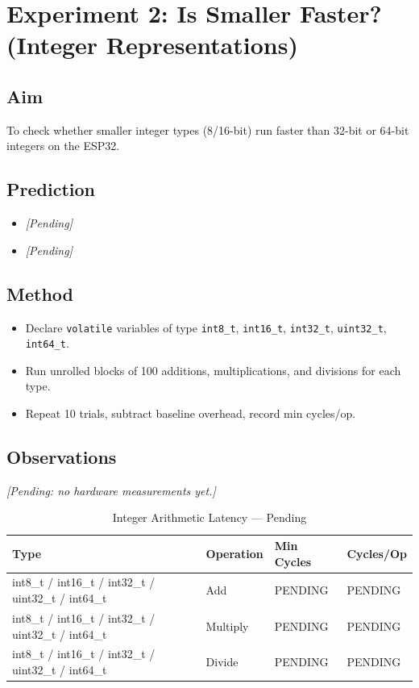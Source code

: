 \section{Experiment 2: Is Smaller Faster? (Integer Representations)}

\subsection{Aim}
To check whether smaller integer types (8/16-bit) run faster than 32-bit or 64-bit integers on the ESP32.

\subsection{Prediction}
\begin{itemize}[noitemsep]
    \item \textit{[Pending]}
    \item \textit{[Pending]}
\end{itemize}

\subsection{Method}
\begin{itemize}[noitemsep]
    \item Declare \texttt{volatile} variables of type \texttt{int8\_t}, \texttt{int16\_t}, \texttt{int32\_t}, \texttt{uint32\_t}, \texttt{int64\_t}.
    \item Run unrolled blocks of 100 additions, multiplications, and divisions for each type.
    \item Repeat 10 trials, subtract baseline overhead, record min cycles/op.
\end{itemize}

\subsection{Observations}
\textit{[Pending: no hardware measurements yet.]}

\begin{table}[htbp]
\centering
\caption{Integer Arithmetic Latency --- Pending}
\label{tab:exp2_obs}
\small
\begin{tabularx}{\textwidth}{l l X X}
\toprule
\textbf{Type} & \textbf{Operation} & \textbf{Min Cycles} & \textbf{Cycles/Op} \\
\midrule
int8\_t / int16\_t / int32\_t / uint32\_t / int64\_t & Add & PENDING & PENDING \\
int8\_t / int16\_t / int32\_t / uint32\_t / int64\_t & Multiply & PENDING & PENDING \\
int8\_t / int16\_t / int32\_t / uint32\_t / int64\_t & Divide & PENDING & PENDING \\
\bottomrule
\end{tabularx}
\end{table}

